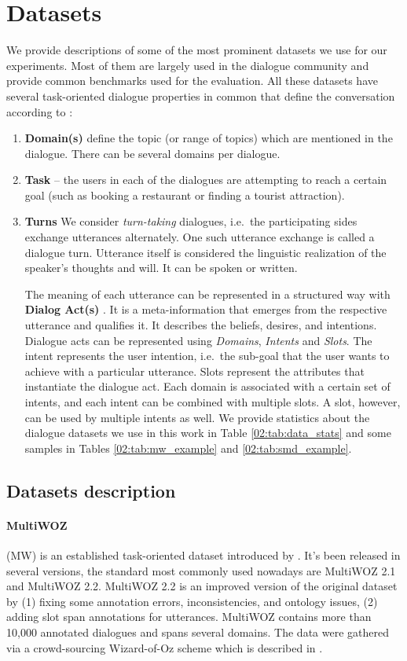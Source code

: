 \section{Datasets}
\label{02:sec:input-data-desc}
We provide descriptions of some of the most prominent datasets we use for our experiments.
Most of them are largely used in the dialogue community and provide common benchmarks used for the evaluation.
All these datasets have several task-oriented dialogue properties in common that define the conversation according to \cite{young2013}:
\begin{enumerate}
\item \textbf{Domain(s)} define the topic (or range of topics) which are mentioned in the dialogue. There can be several domains per dialogue.
\item \textbf{Task} -- the users in each of the dialogues are attempting to reach a certain goal (such as booking a restaurant or finding a tourist attraction).
\item \textbf{Turns} We consider \emph{turn-taking} dialogues, i.e.\ the participating sides exchange utterances alternately.
One such utterance exchange is called a dialogue turn.
Utterance itself is considered the linguistic realization of the speaker's thoughts and will. It can be spoken or written. 

The meaning of each utterance can be represented in a structured way with \textbf{Dialog Act(s)} \cite{Weisser2016}.
It is a meta-information that emerges from the respective utterance and qualifies it. It describes the beliefs, desires, and intentions.
Dialogue acts can be represented using \emph{Domains}, \emph{Intents} and \emph{Slots}. The intent represents the user intention, i.e.\ the sub-goal that the user wants to achieve with a particular utterance.
Slots represent the attributes that instantiate the dialogue act.
Each domain is associated with a certain set of intents, and each intent can be combined with multiple slots. A slot, however, can be used by multiple intents as well.
We provide statistics about the dialogue datasets we use in this work in Table \ref{02:tab:data_stats} and some samples in Tables \ref{02:tab:mw_example} and \ref{02:tab:smd_example}.
\end{enumerate} 
\subsection{Datasets description}
\paragraph{MultiWOZ} (MW) is an established task-oriented dataset introduced by \cite{budzianowski-etal-2018-multiwoz}. It's been released in several versions, the standard most commonly used nowadays are MultiWOZ 2.1 and MultiWOZ 2.2.
MultiWOZ 2.2 is an improved version of the original dataset by (1) fixing some annotation errors, inconsistencies, and ontology issues, (2) adding slot span annotations for utterances.
MultiWOZ contains more than 10,000 annotated dialogues and spans several domains.
The data were gathered via a crowd-sourcing Wizard-of-Oz scheme which is described in \cite{wen-etal-2017-wizard-of-oz}.

